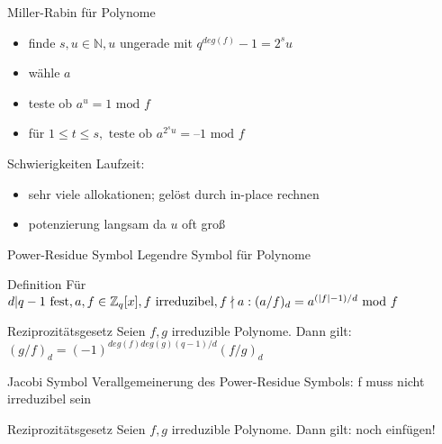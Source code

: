 \documentclass[german,10pt,xcolor=colortbl,compress]{beamer}%
\newcommand{\ZZ}{\mathbb{Z}}
\newcommand{\NN}{\mathbb{N}}
\begin{document}
	\begin{frame}{Miller-Rabin für Polynome}
		\begin{itemize}
			\item finde $s,u \in \NN,u $ ungerade mit $q^{deg(f)}-1=2^su $
			\item wähle $a$ 
			\item teste ob $a^u = 1 \text{ mod } f$
			\item für $1\leq t\leq s, \text{ teste ob } a^{2^s u} = \text{--}1 \text{ mod } f$
			
		\end{itemize}		
	\end{frame}

	\begin{frame}{Schwierigkeiten}
		Laufzeit: 
		
		\begin{itemize}
			\item sehr viele allokationen; gelöst durch in-place rechnen
			\item potenzierung langsam da $u$ oft groß
		\end{itemize}
	\end{frame}





	
	\begin{frame}{Power-Residue Symbol}
		Legendre Symbol für Polynome 
		\begin{block}{Definition}
			Für $d|q-1 \text{ fest},  a,f \in \ZZ_q[x], f \text{ irreduzibel}, f \nmid a :
		\newline 	(a/f)_d = a^{(|f|-1)/d} \text{ mod } f $
			 
		\end{block}
	
		\begin{block}{Reziprozitätsgesetz}
			Seien $f,g$ irreduzible Polynome. Dann gilt:
				$(g/f)_d=(-1)^{deg(f)deg(g)(q-1)/d} (f/g)_d $ 				
		\end{block}
	\end{frame}

	
	\begin{frame}{Jacobi Symbol}
		Verallgemeinerung des Power-Residue Symbols: f muss nicht irreduzibel sein
		
		
		\begin{block}{Reziprozitätsgesetz}
			Seien $f,g$ irreduzible Polynome. Dann gilt:
			noch einfügen!				
		\end{block}
	\end{frame}
\end{document}

